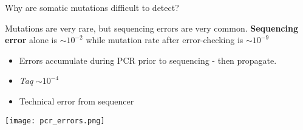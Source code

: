 \documentclass{beamer}
\begin{document}
\begin{frame}{Why are somatic mutations difficult to detect?}

\begin{block}{Mutations are very rare, but sequencing errors are very common.}
\textbf{Sequencing error} alone is \textbf{$\sim10^{-2}$} while mutation rate after error-checking is \textbf{$\sim10^{-9}$}
\end{block}

\begin{itemize}
\item Errors accumulate during PCR prior to sequencing - then propagate.
\item \textit{Taq} $\sim10^{-4}$
\item Technical error from sequencer
\end{itemize}

\texttt{[image: pcr\_errors.png]}


\end{frame}








\end{document}
